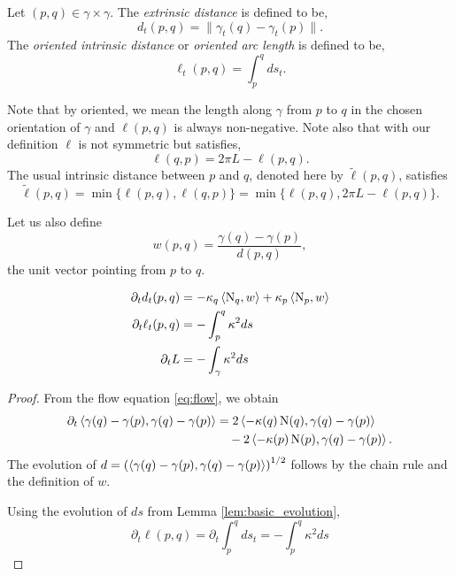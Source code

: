 \documentclass[a4paper, 12pt]{amsart}
\begin{document}
\begin{defn}
\label{defn:dist}
Let \((p,q) \in \gamma \times \gamma\). The \emph{extrinsic distance} is defined to be,
\[
d_t(p, q) = \|\gamma_t(q) - \gamma_t(p)\|.
\]
The \emph{oriented intrinsic distance} or \emph{oriented arc length} is defined to be,
\[
\ell_t(p, q) = \int_p^q ds_t.
\]
\end{defn}

Note that by oriented, we mean the length along \(\gamma\) from \(p\) to \(q\) in the chosen orientation of \(\gamma\) and \(\ell(p, q)\) is always non-negative. Note also that with our definition \(\ell\) is not symmetric but satisfies,
\begin{equation}
\label{eq:ell_symmetry}
\ell(q, p) = 2\pi L - \ell(p, q).
\end{equation}
The usual intrinsic distance between \(p\) and \(q\), denoted here by \(\tilde{\ell}(p, q)\), satisfies
\[
\tilde{\ell}(p, q) = \min\{\ell(p, q), \ell(q, p)\} = \min\{\ell(p, q), 2\pi L - \ell(p, q)\}.
\]

Let us also define
\begin{equation}
\label{eq:w}
w(p, q) = \frac{\gamma(q) - \gamma(p)}{d(p,q)},
\end{equation}
the unit vector pointing from \(p\) to \(q\).

\begin{lemma}
\label{lem:distance_evolution}

\begin{align*}
\partial_t d_t(p, q) &= -\kappa_q \left\langle \operatorname{N}_q,w \right\rangle + \kappa_p \left\langle \operatorname{N}_p,w \right\rangle \\
\partial_t \ell_t(p, q) &= - \int_p^q \kappa^2 ds \\
\partial_t L &= - \int_{\gamma} \kappa^2 ds
\end{align*}
\end{lemma}

\begin{proof}
From the flow equation \eqref{eq:flow}, we obtain
\[
\begin{split}
\partial_t \left\langle \gamma(q) - \gamma(p),\gamma(q) - \gamma(p) \right\rangle &= 2 \left\langle -\kappa(q) \operatorname{N}(q),\gamma(q) - \gamma(p) \right\rangle \\
&\quad  - 2 \left\langle -\kappa(p) \operatorname{N}(p),\gamma(q) - \gamma(p) \right\rangle.
\end{split}
\]
The evolution of \(d = \left(\left\langle \gamma(q) - \gamma(p),\gamma(q) - \gamma(p) \right\rangle\right)^{1/2}\) follows by the chain rule and the definition of \(w\).

Using the evolution of \(ds\) from Lemma \ref{lem:basic_evolution},
\[
\partial_t \ell(p,q) = \partial_t \int_p^q ds_t = -\int_p^q \kappa^2 ds
\]
\end{proof}
\end{document}
